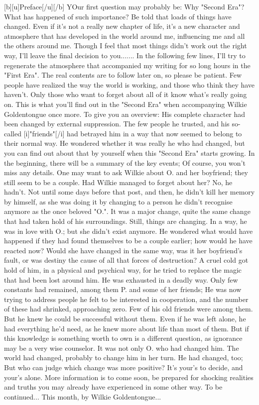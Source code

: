 [b][u]Preface[/u][/b]
YOur first question may probably be: Why "Second Era"? What has happened of such importance? 
Be told that loads of things have changed. Even if it's not a really new chapter of life, it's a new character and atmosphere that has developed in the world around me, influencing me and all the others around me. Though I feel that most things didn't work out the right way, I'll leave the final decision to you....... 
In the following few lines, I'll try to regenerate the atmosphere that accompanied my writing for so long hours in the "First Era". The real contents are to follow later on, so please be patient. 
Few people have realized the way the world is working, and those who think they have haven't. Only those who want to forget about all of it know what's really going on. This is what you'll find out in the "Second Era" when accompanying Wilkie Goldentongue once more. 
To give you an overview: His complete character had been changed by external suppression. The few people he trusted, and his so-called [i]"friends"[/i] had betrayed him in a way that now seemed to belong to their normal way. He wondered whether it was really he who had changed, but you can find out about that by yourself when this "Second Era" starts growing. In the beginning, there will be a summary of the key events; Of course, you won't miss any details. 
One may want to ask Wilkie about O. and her boyfriend; they still seem to be a couple. Had Wilkie managed to forget about her? No, he hadn't. Not until some days before that post, and then, he didn't kill her memory by himself, as she was doing it by changing to a person he didn't recognise anymore as the once beloved "O.". It was a major change, quite the same change that had taken hold of his surroundings. 
Still, things are changing. In a way, he was in love with O.; but she didn't exist anymore. He wondered what would have happened if they had found themselves to be a couple earlier; how would he have reacted now? Would she have changed in the same way, was it her boyfriend's fault, or was destiny the cause of all that forces of destruction? 
A cruel cold got hold of him, in a physical and psychical way, for he tried to replace the magic that had been lost around him. He was exhausted in a deadly way. 
Only few constants had remained, among them P. and some of her friends; He was now trying to address people he felt to be interested in cooperation, and the number of these had shrinked, approaching zero. Few of his old friends were among them. 
But he knew he could be successful without them. Even if he was left alone, he had everything he'd need, as he knew more about life than most of them. But if this knowledge is something worth to own is a different question, as ignorance may be a very wise counselor. It was not only O. who had changed him. 
The world had changed, probably to change him in her turn. He had changed, too; But who can judge which change was more positive? 
It's your's to decide, and your's alone. 
More information is to come soon, be prepared for shocking realities and truths you may already have experienced in some other way. 
To be continued...
This month, by Wilkie Goldentongue...

